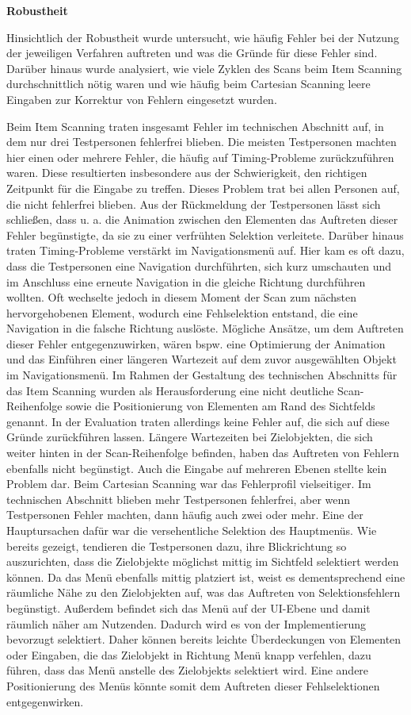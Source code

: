 \textbf{Robustheit}

Hinsichtlich der Robustheit wurde untersucht, wie häufig Fehler bei der Nutzung der jeweiligen Verfahren auftreten und was die Gründe für diese Fehler sind. Darüber hinaus wurde analysiert, wie viele Zyklen des Scans beim Item Scanning durchschnittlich nötig waren und wie häufig beim Cartesian Scanning leere Eingaben zur Korrektur von Fehlern eingesetzt wurden. 

Beim Item Scanning traten insgesamt Fehler im technischen Abschnitt auf, in dem nur drei Testpersonen fehlerfrei blieben. Die meisten Testpersonen machten hier einen oder mehrere Fehler, die häufig auf Timing-Probleme zurückzuführen waren. Diese resultierten insbesondere aus der Schwierigkeit, den richtigen Zeitpunkt für die Eingabe zu treffen. Dieses Problem trat bei allen Personen auf, die nicht fehlerfrei blieben. Aus der Rückmeldung der Testpersonen lässt sich schließen, dass u. a. die Animation zwischen den Elementen das Auftreten dieser Fehler begünstigte, da sie zu einer verfrühten Selektion verleitete. Darüber hinaus traten Timing-Probleme verstärkt im Navigationsmenü auf.  Hier kam es oft dazu, dass die Testpersonen eine Navigation durchführten, sich kurz umschauten und im Anschluss eine erneute Navigation in die gleiche Richtung durchführen wollten. Oft wechselte jedoch in diesem Moment der Scan zum nächsten hervorgehobenen Element, wodurch eine Fehlselektion entstand, die eine Navigation in die falsche Richtung auslöste. Mögliche Ansätze, um dem Auftreten dieser Fehler entgegenzuwirken, wären bspw. eine Optimierung der Animation und das Einführen einer längeren Wartezeit auf dem zuvor ausgewählten Objekt im Navigationsmenü. 
Im Rahmen der Gestaltung des technischen Abschnitts für das Item Scanning wurden als Herausforderung eine nicht deutliche Scan-Reihenfolge sowie die Positionierung von Elementen am Rand des Sichtfelds genannt. In der Evaluation traten allerdings keine Fehler auf, die sich auf diese Gründe zurückführen lassen. Längere Wartezeiten bei Zielobjekten, die sich weiter hinten in der Scan-Reihenfolge befinden, haben das Auftreten von Fehlern ebenfalls nicht begünstigt. Auch die Eingabe auf mehreren Ebenen stellte kein Problem dar. 
Beim Cartesian Scanning war das Fehlerprofil vielseitiger. Im technischen Abschnitt blieben mehr Testpersonen fehlerfrei, aber wenn Testpersonen Fehler machten, dann häufig auch zwei oder mehr. Eine der Hauptursachen dafür war die versehentliche Selektion des Hauptmenüs. Wie bereits gezeigt, tendieren die Testpersonen dazu, ihre Blickrichtung so auszurichten, dass die Zielobjekte möglichst mittig im Sichtfeld selektiert werden können. Da das Menü ebenfalls mittig platziert ist, weist es dementsprechend eine räumliche Nähe zu den Zielobjekten auf, was das Auftreten von Selektionsfehlern begünstigt. Außerdem befindet sich das Menü auf der UI-Ebene und damit räumlich näher am Nutzenden. Dadurch wird es von der Implementierung bevorzugt selektiert. Daher können bereits leichte Überdeckungen von Elementen oder Eingaben, die das Zielobjekt in Richtung Menü knapp verfehlen, dazu führen, dass das Menü anstelle des Zielobjekts selektiert wird. Eine andere Positionierung des Menüs könnte somit dem Auftreten dieser Fehlselektionen entgegenwirken. 
